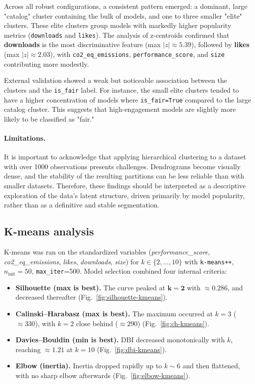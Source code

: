 \documentclass[journal]{IEEEtran}
\begin{document}
Across all robust configurations, a consistent pattern emerged: a dominant, large "catalog" cluster containing the bulk of models, and one to three smaller "elite" clusters. These elite clusters group models with markedly higher popularity metrics (\texttt{downloads} and \texttt{likes}). The analysis of z-centroids confirmed that \textbf{downloads} is the most discriminative feature (max $|z| \approx 5.39$), followed by \textbf{likes} (max $|z| \approx 2.03$), with \texttt{co2\_eq\_emissions}, \texttt{performance\_score}, and \texttt{size} contributing more modestly.

External validation showed a weak but noticeable association between the clusters and the \texttt{is\_fair} label. For instance, the small elite clusters tended to have a higher concentration of models where \texttt{is\_fair=True} compared to the large catalog cluster. This suggests that high-engagement models are slightly more likely to be classified as "fair."

\paragraph{Limitations.} It is important to acknowledge that applying hierarchical clustering to a dataset with over 1000 observations presents challenges. Dendrograms become visually dense, and the stability of the resulting partitions can be less reliable than with smaller datasets. Therefore, these findings should be interpreted as a descriptive exploration of the data's latent structure, driven primarily by model popularity, rather than as a definitive and stable segmentation.


 \subsection{K-means analysis}
K-means was ran on the standardized variables
(\textit{performance\_score}, \textit{co2\_eq\_emissions}, \textit{likes}, \textit{downloads}, \textit{size})
for $k\in\{2,\ldots,10\}$ with \texttt{k-means++}, $n_{\text{init}}{=}50$, \texttt{max\_iter}{=}500.
Model selection combined four internal criteria:

\begin{itemize}
	\item \textbf{Silhouette (max is best).} The curve peaked at $\mathbf{k=2}$ with $\approx\mathbf{0.286}$, and decreased thereafter (Fig.~\ref{fig:silhouette-kmeans}).
	\item \textbf{Calinski--Harabasz (max is best).} The maximum occurred at $k{=}3$ ($\approx\!330$), with $k{=}2$ close behind ($\approx\!290$) (Fig.~\ref{fig:ch-kmeans}).
	\item \textbf{Davies--Bouldin (min is best).} DBI decreased monotonically with $k$, reaching $\approx\!1.21$ at $k{=}10$ (Fig.~\ref{fig:dbi-kmeans}).
	\item \textbf{Elbow (inertia).} Inertia dropped rapidly up to $k{\sim}6$ and then flattened, with no sharp elbow afterwards (Fig.~\ref{fig:elbow-kmeans}).
\end{itemize}
\end{document}
